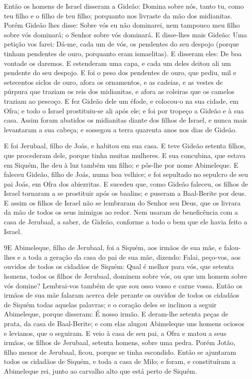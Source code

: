 Então os homens de Israel disseram a Gideão: Domina sobre nós,
tanto tu, como teu filho e o filho de teu filho; porquanto nos
livraste da mão dos midianitas. Porém Gideão lhes disse:
Sobre vós eu não dominarei, nem tampouco meu filho sobre vós
dominará; o Senhor sobre vós dominará. E disse-lhes mais
Gideão: Uma petição vos farei: Dá-me, cada um de vós, os pendentes
do seu despojo (porque tinham pendentes de ouro, porquanto eram
ismaelitas). E disseram eles: De boa vontade os daremos. E
estenderam uma capa, e cada um deles deitou ali um pendente do seu
despojo. E foi o peso dos pendentes de ouro, que pediu, mil e
setecentos siclos de ouro, afora os ornamentos, e as cadeias, e as
vestes de púrpura que traziam os reis dos midianitas, e afora as
coleiras que os camelos traziam ao pescoço. E fez Gideão dele
um éfode, e colocou-o na sua cidade, em Ofra; e todo o Israel
prostituiu-se ali após ele; e foi por tropeço a Gideão e à sua casa.
Assim foram abatidos os midianitas diante dos filhos de
Israel, e nunca mais levantaram a sua cabeça; e sossegou a terra
quarenta anos nos dias de Gideão.

E foi Jerubaal, filho de Joás, e habitou em sua casa. E
teve Gideão setenta filhos, que procederam dele, porque tinha muitas
mulheres. E sua concubina, que estava em Siquém, lhe deu à
luz também um filho; e pôs-lhe por nome Abimeleque. E faleceu
Gideão, filho de Joás, numa boa velhice; e foi sepultado no sepulcro
de seu pai Joás, em Ofra dos abiezritas. E sucedeu que, como
Gideão faleceu, os filhos de Israel tornaram a se prostituir após os
baalins; e puseram a Baal-Berite por deus. E assim os filhos
de Israel não se lembraram do Senhor seu Deus, que os livrara da mão
de todos os seus inimigos ao redor. Nem usaram de
beneficência com a casa de Jerubaal, a saber, de Gideão, conforme a
todo o bem que ele havia feito a Israel.

\medskip

\lettrine{9} E Abimeleque, filho de Jerubaal, foi a Siquém,
aos irmãos de sua mãe, e falou-lhes e a toda a geração da casa do
pai de sua mãe, dizendo: Falai, peço-vos, aos ouvidos de todos
os cidadãos de Siquém: Qual é melhor para vós, que setenta homens,
todos os filhos de Jerubaal, dominem sobre vós, ou que um homem
sobre vós domine? Lembrai-vos também de que sou osso vosso e carne
vossa. Então os irmãos de sua mãe falaram acerca dele perante os
ouvidos de todos os cidadãos de Siquém todas aquelas palavras; e o
coração deles se inclinou a seguir Abimeleque, porque disseram: É
nosso irmão. E deram-lhe setenta peças de prata, da casa de
Baal-Berite; e com elas alugou Abimeleque uns homens ociosos e
levianos, que o seguiram. E veio à casa de seu pai, a Ofra e
matou a seus irmãos, os filhos de Jerubaal, setenta homens, sobre
uma pedra. Porém Jotão, filho menor de Jerubaal, ficou, porque se
tinha escondido. Então se ajuntaram todos os cidadãos de Siquém,
e toda a casa de Milo; e foram, e constituíram a Abimeleque rei,
junto ao carvalho alto que está perto de Siquém.

